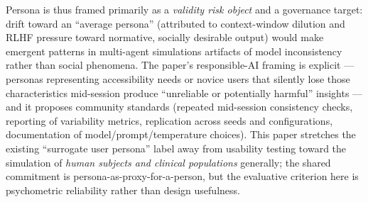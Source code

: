 Persona is thus framed primarily as a \emph{validity risk object} and a governance target: drift toward an ``average persona'' (attributed to context-window dilution and RLHF pressure toward normative, socially desirable output) would make emergent patterns in multi-agent simulations artifacts of model inconsistency rather than social phenomena. The paper's responsible-AI framing is explicit --- personas representing accessibility needs or novice users that silently lose those characteristics mid-session produce ``unreliable or potentially harmful'' insights --- and it proposes community standards (repeated mid-session consistency checks, reporting of variability metrics, replication across seeds and configurations, documentation of model/prompt/temperature choices). This paper stretches the existing ``surrogate user persona'' label away from usability testing toward the simulation of \emph{human subjects and clinical populations} generally; the shared commitment is persona-as-proxy-for-a-person, but the evaluative criterion here is psychometric reliability rather than design usefulness.


